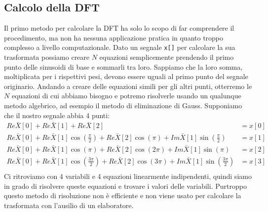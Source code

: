 \subsection{Calcolo della DFT}
Il primo metodo per calcolare la DFT ha solo lo scopo di far comprendere il
procedimento, ma non ha nessuna applicazione pratica in quanto troppo complesso
a livello computazionale. Dato un segnale \texttt{x[]} per calcolare la sua
trasformata possiamo creare $N$ equazioni semplicemente prendendo il primo punto
delle sinusoidi di base e sommarli tra loro. Sappiamo che la loro somma,
moltiplicata per i rispettivi pesi, devono essere uguali al primo punto del
segnale originario. Andando a creare delle equazioni simili per gli altri punti,
otterremo le $N$ equazioni di cui abbiamo bisogno e potremo risolverle usando un
qualunque metodo algebrico, ad esempio il metodo di eliminazione di Gauss.
Supponiamo che il nostro segnale abbia 4 punti:
\begin{align*}
Re\bar{X}[0] + Re\bar{X}[1] + Re\bar{X}[2] & = x[0]\\
Re\bar{X}[0] + Re\bar{X}[1]\cos\left( \frac{\pi}{2} \right) +
Re\bar{X}[2]\cos\left( \pi \right) + Im\bar{X}[1]\sin\left( \frac{\pi}{2}
\right) & = x[1]\\
Re\bar{X}[0] + Re\bar{X}[1]\cos\left( \pi \right) + Re\bar{X}[2]\cos\left( 2\pi
\right) + Im\bar{X}[1]\sin\left( \pi \right) & = x[2]\\
Re\bar{X}[0] + Re\bar{X}[1]\cos\left( \frac{3\pi}{2} \right) +
Re\bar{X}[2]\cos\left( 3\pi \right) + Im\bar{X}[1]\sin\left( \frac{3\pi}{2}
\right) & = x[3]\\
\end{align*}
Ci ritroviamo con 4 variabili e 4 equazioni linearmente indipendenti, quindi
siamo in grado di risolvere queste equazioni e trovare i valori delle
variabili. Purtroppo questo metodo di risoluzione non \`e efficiente e non
viene usato per calcolare la trasformata con l'ausilio di un elaboratore.
